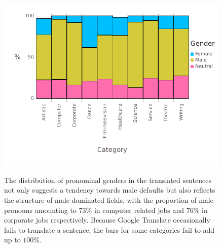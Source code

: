 \documentclass{article}
\begin{document}
\begin{figure}[H]
	\centering
	\includegraphics[width=\linewidth]{pictures/gender-by-category}
	\label{fig:gender-by-category}
	\caption{The distribution of pronominal genders in the translated sentences not only suggests a tendency towards male defaults but also reflects the structure of male dominated fields, with the proportion of male pronouns amounting to $73\%$ in computer related jobs and $76\%$ in corporate jobs respectively. Because Google Translate occasionally fails to translate a sentence, the bars for some categories fail to add up to $100\%$.}
\end{figure}
\end{document}
